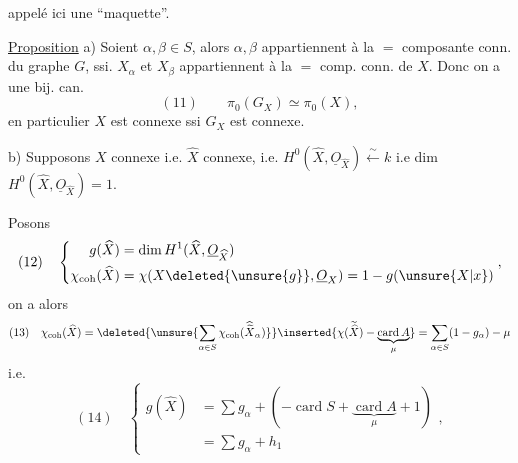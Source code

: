 appelé ici une ``maquette''.

\uline{Proposition} 
a) Soient $\alpha,\beta\in S$, alors $\alpha,\beta$ appartiennent à la $=$ composante conn. du graphe $G$, ssi. $X_\alpha$ et $X_\beta$ appartiennent à la $=$ comp. conn. de $X$. Donc  on a une bij. can.
\[
(11)\qquad\pi_0(G_X)\simeq\pi_0(X),
\]
en particulier $X$ est connexe ssi $G_X$ est connexe.

b) Supposons $X$ connexe i.e. $\widehat X$ connexe, i.e. $H^0(\widehat X,\underline O_{\widehat X})\xleftarrow{\sim}k$ i.e dim $H^0(\widehat X,\underline O_{\widehat X})=1$.

Posons 
\[
(12)\quad\left\{\begin{aligned}
g(\widehat X)&=\dim H^1(\widehat X,\underline O_{\widehat X})\\
\chi_{\mathrm{coh}}(\widehat X)&=\chi(X\deleted{\unsure{g}},\underline O_X)=1-g(\unsure{X|x})
\end{aligned}\right.,
\]
on a alors
\[
(13)\quad\chi_{\mathrm{coh}}(\widehat X)
=\deleted{\unsure{\sum_{\alpha\in S}\chi_{\mathrm{coh}}(\widehat{\widetilde X}_\alpha)}}
\inserted{\chi(\widetilde{\widehat X})-\underbrace{\operatorname{card}A}_{\mu}}
=\sum_{\alpha\in S}(1-g_\alpha)-\mu
\]
i.e.
\[
(14)\quad\left\{\begin{aligned}
g(\widehat X)&=\sum g_\alpha+(-\operatorname{card}S+\underbrace{\operatorname{card}A}_{\mu}+1)\\
&=\sum g_\alpha+h_1
\end{aligned}\right.,
\]
